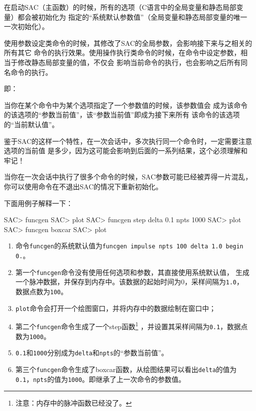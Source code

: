 在启动SAC（主函数）的时候，所有的选项（C语言中的全局变量和静态局部变量）都会被初始化为
指定的``系统默认参数值''（全局变量和静态局部变量的唯一一次初始化）。

使用参数设定类命令的时候，其修改了SAC的全局参数，会影响接下来与之相关的所有其它
命令的执行效果。使用操作执行类命令的时候，在命令中设定参数，相当于修改静态局部变量的值，不仅会
影响当前命令的执行，也会影响之后所有同名命令的执行。

即：

当你在某个命令中为某个选项指定了一个参数值的时候，该参数值会
成为该命令的该选项的``参数当前值''，该``参数当前值''即成为接下来所有
该命令的该选项的``当前默认值''。

鉴于SAC的这样一个特性，在一次会话中，多次执行同一个命令时，一定需要注意选项的当前值
是多少，因为这可能会影响到后面的一系列结果，这个必须理解和牢记！

\begin{Tips}
当你在一次会话中执行了很多个命令的时候，SAC参数可能已经被弄得一片混乱，
你可以使用命令在不退出SAC的情况下重新初始化。
\end{Tips}

下面用例子解释一下：
\begin{SACCode}
SAC> funcgen
SAC> plot
SAC> funcgen step delta 0.1 npts 1000
SAC> plot
SAC> funcgen boxcar
SAC> plot
\end{SACCode}

\begin{enumerate}
\item 命令\lstinline{funcgen}的系统默认值为\lstinline{funcgen impulse npts 100 delta 1.0 begin 0.}。
\item 第一个\lstinline{funcgen}命令没有使用任何选项和参数，其直接使用系统默认值，
    生成一个脉冲数据，并保存到内存中。该数据的起始时间为0，采样间隔为\lstinline{1.0}，
    数据点数为\lstinline{100}。
\item \lstinline{plot}命令会打开一个绘图窗口，并将内存中的数据绘制在窗口中；
\item 第二个\lstinline{funcgen}命令生成了一个step函数\footnote{注意：内存中的脉冲函数已经没了。}
    ，并设置其采样间隔为\lstinline{0.1}，数据点数为\lstinline{1000}。
\item \lstinline{0.1}和\lstinline{1000}分别成为\lstinline{delta}和\lstinline{npts}的``参数当前值''。
\item 第三个\lstinline{funcgen}命令生成了boxcar函数，从绘图结果可以看出\lstinline{delta}的值为
    \lstinline{0.1}，\lstinline{npts}的值为\lstinline{1000}。即继承了上一次命令的参数值。
\end{enumerate}

